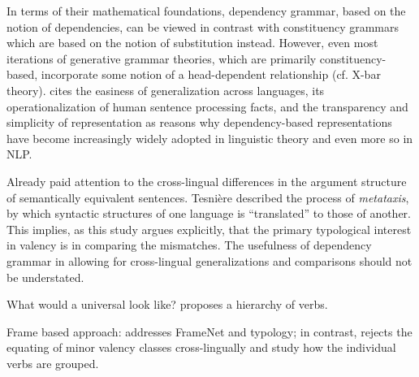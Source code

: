 In terms of their mathematical foundations, dependency grammar, based on the notion of dependencies, can be viewed in contrast with constituency grammars which are based on the notion of substitution instead\citep{stabler2019}. However, even most iterations of generative grammar theories, which are primarily constituency-based, incorporate some notion of a head-dependent relationship (cf. X-bar theory). \citet{demarneffe2019} cites the easiness of generalization across languages, its operationalization of human sentence processing facts, and the transparency and simplicity of representation as reasons why dependency-based representations have become increasingly widely adopted in linguistic theory and even more so in NLP.

Already \citet{tesniere1959} paid attention to the cross-lingual differences in the argument structure of semantically equivalent sentences. Tesnière described the process of \textit{metataxis}, by which syntactic structures of one language is ``translated'' to those of another. This implies, as this study argues explicitly, that the primary typological interest in valency is in comparing the mismatches. The usefulness of dependency grammar in allowing for cross-lingual generalizations and comparisons should not be understated. 

 


What would a universal look like? \citet{tsunoda1981, tsunoda1985, tsunoda2015} proposes a hierarchy of verbs.

Frame based approach: \citet{baker2020, ellsworth2021} addresses FrameNet and typology; in contrast, \citet{say2014} rejects the equating of minor valency classes cross-lingually and study how the individual verbs are grouped.






